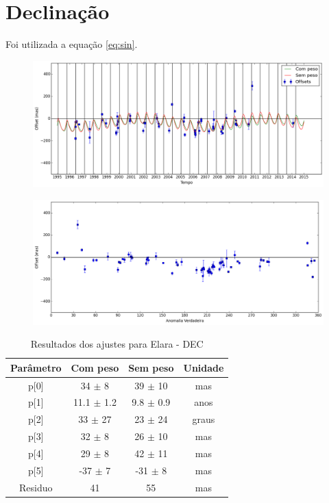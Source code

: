 \documentclass[11pt,a4paper]{report}
\begin{document}
\section*{Declinação}

Foi utilizada a equação \ref{eq:sin}.

\begin{figure}[h]
\includegraphics[scale=0.45]{Elara/DEC.png} 
\end{figure}

\begin{figure}[h]
\includegraphics[scale=0.45]{Elara/DEC_anom.png}  
\end{figure}

\begin{table}[h!]
\caption{\label{Tab: Elara-DEC} Resultados dos ajustes para Elara - DEC}
\begin{centering}
\begin{tabular}{cccc}
\hline
\hline
Parâmetro & Com peso & Sem peso & Unidade\tabularnewline
\hline
p[0] & 34 $\pm$ 8 & 39 $\pm$ 10 & mas\\
p[1] & 11.1 $\pm$ 1.2 & 9.8 $\pm$ 0.9 & anos\\
p[2] & 33 $\pm$ 27 & 23 $\pm$ 24 & graus\\
p[3] & 32 $\pm$ 8 & 26 $\pm$ 10 & mas\\
p[4] & 29 $\pm$ 8 & 42 $\pm$ 11 & mas\\
p[5] & -37 $\pm$ 7 & -31 $\pm$ 8 & mas\\
Residuo & 41 & 55 & mas\\
\hline 
\end{tabular} 
\par\end{centering}
\end{table}
\end{document}
